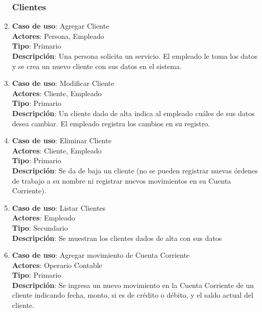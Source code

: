 \documentclass[12pt]{extarticle}
\begin{document}
\begin{spacing}{1.2}
\begin{enumerate}
            \subsubsection{Clientes}



            \item 	\textbf{Caso de uso}: Agregar Cliente\\
                    \textbf{Actores}: Persona, Empleado\\
                    \textbf{Tipo}: Primario\\
                    \textbf{Descripción}: Una persona solicita un servicio. El empleado le toma los datos y se crea un nuevo cliente con sus datos en el sistema.

            \item 	\textbf{Caso de uso}: Modificar Cliente\\
                    \textbf{Actores}: Cliente, Empleado\\
                    \textbf{Tipo}: Primario\\
                    \textbf{Descripción}: Un cliente dado de alta indica al empleado cuáles de sus datos desea cambiar. El empleado registra los cambios en su registro.

            \item 	\textbf{Caso de uso}: Eliminar Cliente\\
                    \textbf{Actores}: Cliente, Empleado\\
                    \textbf{Tipo}: Primario\\
                    \textbf{Descripción}: Se da de baja un cliente (no se pueden registrar nuevas órdenes de trabajo a su nombre ni registrar nuevos movimientos en su Cuenta Corriente).

            \item 	\textbf{Caso de uso}: Listar Clientes\\
                    \textbf{Actores}: Empleado\\
                    \textbf{Tipo}: Secundario\\
                    \textbf{Descripción}: Se muestran los clientes dados de alta con sus datos

            \item 	\textbf{Caso de uso}: Agregar movimiento de Cuenta Corriente\\
                    \textbf{Actores}: Operario Contable\\
                    \textbf{Tipo}: Primario\\
                    \textbf{Descripción}: Se ingresa un nuevo movimiento en la Cuenta Corriente de un cliente indicando fecha, monto, si es de crédito o débito, y el saldo actual del cliente.


\end{enumerate}
\end{spacing}
\end{document}
